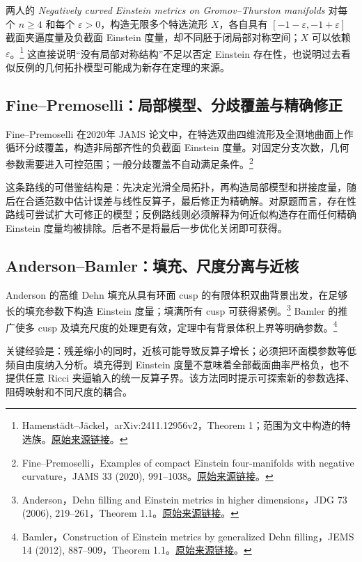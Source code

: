 \documentclass[11pt,a4paper]{article}
\theoremstyle{definition}
\newcommand{\src}[3]{\footnote{\raggedright #1，#2。\href{#3}{原始来源链接}。}}
\begin{document}
两人的 \emph{Negatively curved Einstein metrics on Gromov--Thurston manifolds} 对每个 $n\ge4$ 和每个 $\varepsilon>0$，构造无限多个特选流形 $X$，各自具有 $[-1-\varepsilon,-1+\varepsilon]$ 截面夹逼度量及负截面 Einstein 度量，却不同胚于闭局部对称空间；$X$ 可以依赖 $\varepsilon$。\src{Hamenstädt--Jäckel}{arXiv:2411.12956v2，Theorem 1；范围为文中构造的特选族}{https://arxiv.org/html/2411.12956v2}
这直接说明“没有局部对称结构”不足以否定 Einstein 存在性，也说明过去看似反例的几何拓扑模型可能成为新存在定理的来源。

\subsection{Fine--Premoselli：局部模型、分歧覆盖与精确修正}

Fine--Premoselli 在2020年 JAMS 论文中，在特选双曲四维流形及全测地曲面上作循环分歧覆盖，构造非局部齐性的负截面 Einstein 度量。对固定分支次数，几何参数需要进入可控范围；一般分歧覆盖不自动满足条件。\src{Fine--Premoselli}{Examples of compact Einstein four-manifolds with negative curvature，JAMS 33 (2020), 991--1038}{https://arxiv.org/abs/1802.00608}

这条路线的可借鉴结构是：先决定光滑全局拓扑，再构造局部模型和拼接度量，随后在合适范数中估计误差与线性反算子，最后修正为精确解。对原题而言，存在性路线可尝试扩大可修正的模型；反例路线则必须解释为何近似构造存在而任何精确 Einstein 度量均被排除。后者不是将最后一步优化关闭即可获得。

\subsection{Anderson--Bamler：填充、尺度分离与近核}

Anderson 的高维 Dehn 填充从具有环面 cusp 的有限体积双曲背景出发，在足够长的填充参数下构造 Einstein 度量；填满所有 cusp 可获得紧例。\src{Anderson}{Dehn filling and Einstein metrics in higher dimensions，JDG 73 (2006), 219--261，Theorem 1.1}{https://www.math.stonybrook.edu/~anderson/dehn.pdf}
Bamler 的推广使多 cusp 及填充尺度的处理更有效，定理中有背景体积上界等明确参数。\src{Bamler}{Construction of Einstein metrics by generalized Dehn filling，JEMS 14 (2012), 887--909，Theorem 1.1}{https://arxiv.org/abs/0911.4730v2}

关键经验是：残差缩小的同时，近核可能导致反算子增长；必须把环面模参数等低频自由度纳入分析。填充得到 Einstein 度量不意味着全部截面曲率严格负，也不提供任意 Ricci 夹逼输入的统一反算子界。该方法同时提示可探索新的参数选择、阻碍映射和不同尺度的耦合。
\end{document}
